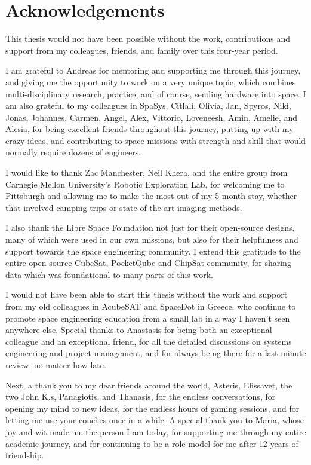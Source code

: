 \documentclass[a4paper,nobib,justified,final]{tufte-book}
\begin{document}
\cleardoublepage
\chapter*{Acknowledgements}
\label{sec:acknowledgements}

\justify

\begin{fullwidth}
This thesis would not have been possible without the work, contributions and support from my colleagues, friends, and family over this four-year period.

I am grateful to Andreas for mentoring and supporting me through this journey, and giving me the opportunity to work on a very unique topic, which combines multi-disciplinary research, practice, and of course, sending hardware into space. I am also grateful to my colleagues in SpaSys, Citlali, Olivia, Jan, 
Spyros, Niki, Jonas, Johannes, Carmen, Angel, Alex, Vittorio, Loveneesh, Amin, Amelie, and Alesia, for being excellent friends throughout this journey, putting up with my crazy ideas, and contributing to space missions with strength and skill that would normally require dozens of engineers.

I would like to thank Zac Manchester, Neil Khera, and the entire group from Carnegie Mellon University's Robotic Exploration Lab, for welcoming me to Pittsburgh and allowing me to make the most out of my 5-month stay, whether that involved camping trips or state-of-the-art imaging methods.

I also thank the Libre Space Foundation not just for their open-source designs, many of which were used in our own missions, but also for their helpfulness and support towards the space engineering community. I extend this gratitude to the entire open-source CubeSat, PocketQube and ChipSat community, for sharing data which was foundational to many parts of this work. 

I would not have been able to start this thesis without the work and support from my old colleagues in AcubeSAT and SpaceDot in Greece, who continue to promote space engineering education from a small lab in a way I haven't seen anywhere else. Special thanks to Anastasis for being both an exceptional colleague and an exceptional friend, for all the detailed discussions on systems engineering and project management, and for always being there for a last-minute review, no matter how late.

Next, a thank you to my dear friends around the world, Asteris, Elissavet, the two John K.s, Panagiotis, and Thanasis, for the endless conversations, for opening my mind to new ideas, for the endless hours of gaming sessions, and for letting me use your couches once in a while. A special thank you to Maria, whose joy and wit made me the person I am today, for supporting me through my entire academic journey, and for continuing to be a role model for me after 12 years of friendship.


\end{fullwidth}
\end{document}
